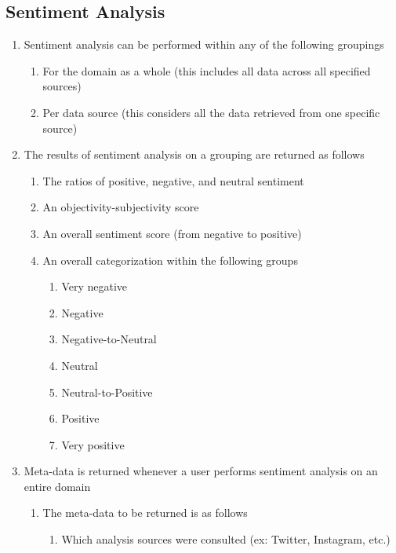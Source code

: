 \documentclass[12pt]{article}
\begin{document}
\subsection{Sentiment Analysis}
\begin{enumerate}
  \item Sentiment analysis can be performed within any of the following groupings
        \begin{enumerate}
          \item For the domain as a whole (this includes all data across all specified sources)
          \item Per data source (this considers all the data retrieved from one specific source)
        \end{enumerate}
  \item The results of sentiment analysis on a grouping are returned as follows
        \begin{enumerate}
          \item The ratios of positive, negative, and neutral sentiment
          \item An objectivity-subjectivity score
          \item An overall sentiment score (from negative to positive)
          \item An overall categorization within the following groups
                \begin{enumerate}
                  \item Very negative
                  \item Negative
                  \item Negative-to-Neutral
                  \item Neutral
                  \item Neutral-to-Positive
                  \item Positive
                  \item Very positive
                \end{enumerate}
        \end{enumerate}
  \item Meta-data is returned whenever a user performs sentiment analysis on an entire domain
        \begin{enumerate}
          \item The meta-data to be returned is as follows
                \begin{enumerate}
                  \item Which analysis sources were consulted (ex: Twitter, Instagram, etc.)

\end{enumerate}
\end{enumerate}
\end{enumerate}
\end{document}
